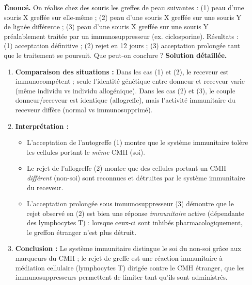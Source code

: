 \documentclass[11pt]{article}
\begin{document}
\begin{exoresolu}
\textbf{Énoncé.} On réalise chez des souris les greffes de peau suivantes : (1) peau d'une souris X greffée sur elle-même ; (2) peau d'une souris X greffée sur une souris Y de lignée différente ; (3) peau d'une souris X greffée sur une souris Y préalablement traitée par un immunosuppresseur (ex. ciclosporine). Résultats : (1) acceptation définitive ; (2) rejet en 12 jours ; (3) acceptation prolongée tant que le traitement se poursuit. Que peut-on conclure ?
\tcblower
\textbf{Solution détaillée.}
\begin{enumerate}
\item \textbf{Comparaison des situations :} Dans les cas (1) et (2), le receveur est immunocompétent ; seule l'identité génétique entre donneur et receveur varie (même individu vs individu allogénique). Dans les cas (2) et (3), le couple donneur/receveur est identique (allogreffe), mais l'activité immunitaire du receveur diffère (normal vs immunosupprimé).
\item \textbf{Interprétation :}
\begin{itemize}
\item L'acceptation de l'autogreffe (1) montre que le système immunitaire tolère les cellules portant le \emph{même} CMH (soi).
\item Le rejet de l'allogreffe (2) montre que des cellules portant un CMH \emph{différent} (non-soi) sont reconnues et détruites par le système immunitaire du receveur.
\item L'acceptation prolongée sous immunosuppresseur (3) démontre que le rejet observé en (2) est bien une réponse \emph{immunitaire} active (dépendante des lymphocytes T) : lorsque ceux-ci sont inhibés pharmacologiquement, le greffon étranger n'est plus détruit.
\end{itemize}
\item \textbf{Conclusion :} Le système immunitaire distingue le soi du non-soi grâce aux marqueurs du CMH ; le rejet de greffe est une réaction immunitaire à médiation cellulaire (lymphocytes T) dirigée contre le CMH étranger, que les immunosuppresseurs permettent de limiter tant qu'ils sont administrés.
\end{enumerate}
\end{exoresolu}
\end{document}
